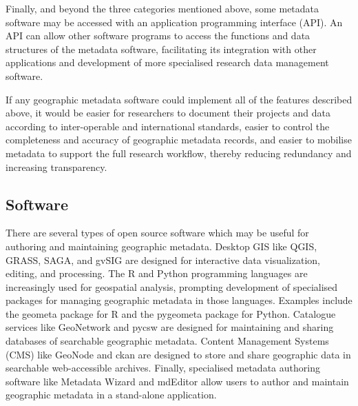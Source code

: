\documentclass{isprs} %
\begin{document}
Finally, and beyond the three categories mentioned above, some metadata software may be accessed with an application programming interface (API).
An API can allow other software programs to access the functions and data structures of the metadata software, facilitating its integration with other applications and development of more specialised research data management software.

If any geographic metadata software could implement all of the features described above, it would be easier for researchers to document their projects and data according to inter-operable and international standards, easier to control the completeness and accuracy of geographic metadata records, and easier to mobilise metadata to support the full research workflow, thereby reducing redundancy and increasing transparency.

\subsection{Software}

There are several types of open source software which may be useful for authoring and maintaining geographic metadata.
Desktop GIS like QGIS, GRASS, SAGA, and gvSIG are designed for interactive data visualization, editing, and processing.
The R and Python programming languages are increasingly used for geospatial analysis, prompting development of specialised packages for managing geographic metadata in those languages. Examples include the geometa package for R and the pygeometa package for Python.
Catalogue services like GeoNetwork and pycsw are designed for maintaining and sharing databases of searchable geographic metadata.
Content Management Systems (CMS) like GeoNode and ckan are designed to store and share geographic data in searchable web-accessible archives.
Finally, specialised metadata authoring software like Metadata Wizard and mdEditor allow users to author and maintain geographic metadata in a stand-alone application.
\end{document}
